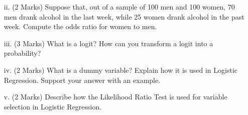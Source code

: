 \documentclass[a4paper,12pt]{article}
\begin{document}
%

\begin{itemize}
\item[ii.](2 Marks) Suppose that, out of a sample of 100 men and 100 women, 70 men drank alcohol in the last week, while 25 women drank alcohol in the past week. Compute the odds ratio for women to men.
\item[iii.](3 Marks)
What is a logit? How can you transform a logit into a probability?
\item[iv.](2 Marks)
What is a dummy variable? Explain how it is used in Logistic Regression. Support your answer with an example.
\item[v.](2 Marks) Describe how the Likelihood Ratio Test is used for variable selection in Logistic Regression.
\end{itemize}
\end{document}
